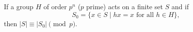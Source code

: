 If a group $H$ of order $p^n$ ($p$ prime) acts on a finite set $S$ and if
$$S_0 = \{x \in S \mid hx = x \text{ for all } h \in H\},$$
then $|S| \equiv |S_0| \pmod{p}$.
